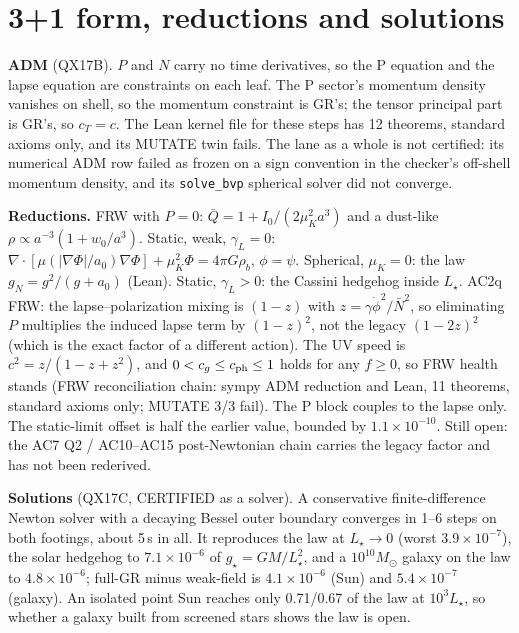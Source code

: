 \documentclass[10pt]{article}
\begin{document}
\section{3+1 form, reductions and solutions}
\textbf{ADM} (QX17B). $P$ and $N$ carry no time derivatives, so the P equation and the lapse equation are constraints on each leaf.
The P sector's momentum density vanishes on shell, so the momentum constraint is GR's; the tensor principal part is GR's, so $c_T=c$.
The Lean kernel file for these steps has 12 theorems, standard axioms only, and its MUTATE twin fails.
The lane as a whole is not certified: its numerical ADM row failed as frozen on a sign convention in the checker's off-shell momentum density, and its \texttt{solve\_bvp} spherical solver did not converge.

\textbf{Reductions.}
FRW with $P=0$: $\bar Q=1+I_0/(2\mu_K^2a^3)$ and a dust-like $\rho\propto a^{-3}(1+w_0/a^3)$.
Static, weak, $\gamma_L=0$: $\nabla\!\cdot[\mu(|\nabla\Phi|/a_0)\nabla\Phi]+\mu_K^2\Phi=4\pi G\rho_b$, $\phi=\psi$.
Spherical, $\mu_K=0$: the law $g_N=g^2/(g+a_0)$ (Lean).
Static, $\gamma_L>0$: the Cassini hedgehog inside $L_\star$.
AC2q FRW: the lapse--polarization mixing is $(1-z)$ with $z=\gamma\dot\phi^2/\bar N^2$, so eliminating $P$ multiplies the induced lapse term by $(1-z)^2$, not the legacy $(1-2z)^2$ (which is the exact factor of a different action). The UV speed is $c^2=z/(1-z+z^2)$, and $0<c_g\le c_{\rm ph}\le1$ holds for any $f\ge0$, so FRW health stands (FRW reconciliation chain: sympy ADM reduction and Lean, 11 theorems, standard axioms only; MUTATE 3/3 fail). The P block couples to the lapse only. The static-limit offset is half the earlier value, bounded by $1.1\times10^{-10}$. Still open: the AC7 Q2 / AC10--AC15 post-Newtonian chain carries the legacy factor and has not been rederived.

\textbf{Solutions} (QX17C, CERTIFIED as a solver). A conservative finite-difference Newton solver with a decaying Bessel outer boundary converges in 1--6 steps on both footings, about 5\,s in all.
It reproduces the law at $L_\star\to0$ (worst $3.9\times10^{-7}$), the solar hedgehog to $7.1\times10^{-6}$ of $g_\star=GM/L_\star^2$, and a $10^{10}M_\odot$ galaxy on the law to $4.8\times10^{-6}$; full-GR minus weak-field is $4.1\times10^{-6}$ (Sun) and $5.4\times10^{-7}$ (galaxy).
An isolated point Sun reaches only 0.71/0.67 of the law at $10^3L_\star$, so whether a galaxy built from screened stars shows the law is open.
\end{document}
